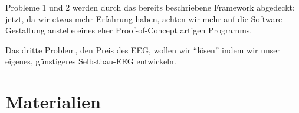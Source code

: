 \documentclass[10pt]{article}
\begin{document}
Probleme 1 und 2 werden durch das bereits beschriebene Framework abgedeckt; jetzt, da wir etwas mehr Erfahrung haben, achten wir mehr auf die Software-Gestaltung anstelle eines eher Proof-of-Concept artigen Programms.

Das dritte Problem, den Preis des EEG, wollen wir \enquote{lösen} indem wir unser eigenes, günstigeres Selbstbau-EEG entwickeln.

\newpage %

\section{Materialien}
\end{document}
